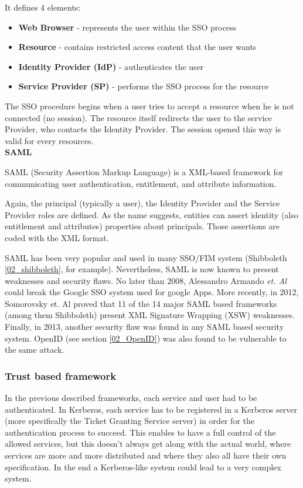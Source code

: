 It defines 4 elements:
\begin{itemize}
	\item \textbf{Web Browser} - represents the user within the SSO process
	\item \textbf{Resource} - contains restricted access content that the user wants
	\item \textbf{Identity Provider (IdP)} - authenticates the user
	\item \textbf{Service Provider (SP)} - performs the SSO process for the resource
\end{itemize} 

The SSO procedure begins when a user tries to accept a resource when he is not connected (no session). The resource itself redirects the user to the service Provider, who contacts the Identity Provider. The session opened this way is valid for every resources.
\\

\quad \tabitem \textbf{SAML}

SAML (Security Assertion Markup Language)\cite{hughes2005security} is a XML-based framework for communicating user authentication, entitlement, and attribute information.

Again, the principal (typically a user), the Identity Provider and the Service Provider roles are defined. As the name suggests, entities can assert identity (also entitlement and attributes) properties about principals. Those assertions are coded with the XML format.

SAML has been very popular and used in many SSO/FIM system (Shibboleth \ref{02_shibboleth}, for example). Nevertheless, SAML is now known to present weaknesses and security flaws. No later than 2008, Alessandro Armando \textit{et. Al} could break the Google SSO system used for google Apps\cite{Armando2008}. More recently, in 2012, Somorovsky et. Al proved that 11 of the 14 major SAML based frameworks (among them Shibboleth) present XML Signature Wrapping (XSW) weaknesses\cite{somorovsky2012breaking}. Finally, in 2013, another security flaw was found in any SAML based security system\cite{armando2013authentication}. OpenID (see section \ref{02_OpenID}) was also found to be vulnerable to the same attack.




\subsubsection{Trust based framework}
In the previous described frameworks, each service and user had to be authenticated. In Kerberos, each service has to be registered in a Kerberos server (more specifically the Ticket Granting Service server) in order for the authentication process to succeed. This enables to have a full control of the allowed services, but this doesn't always get along with the actual world, where services are more and more distributed and where they also all have their own specification. In the end a Kerberos-like system could lead to a very complex system. 

